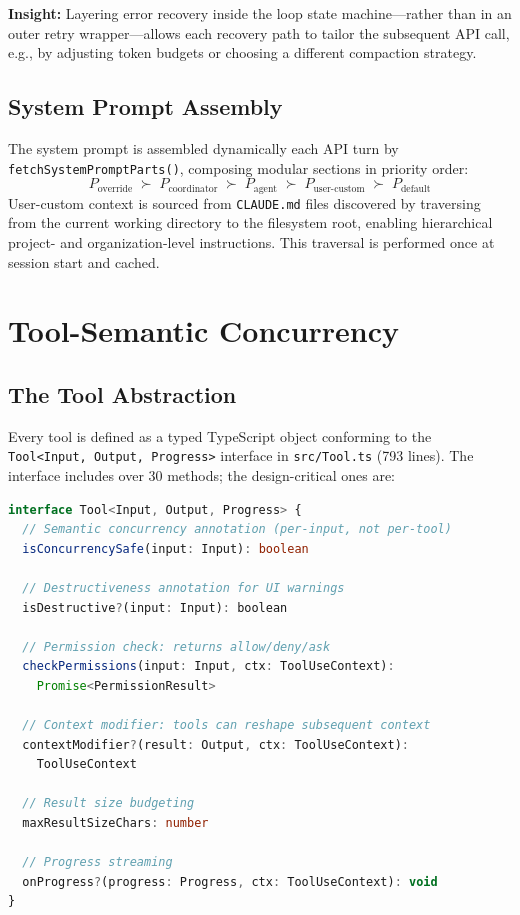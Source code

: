 \documentclass{article}
\newcommand{\file}[1]{\texttt{\small #1}}
\newcommand{\code}[1]{\texttt{#1}}
\newcommand{\insight}[1]{%
  \begin{mdframed}[backgroundcolor=blue!5, linecolor=blue!30, linewidth=0.5pt,
    topline=true, bottomline=true, leftline=true, rightline=true,
    innertopmargin=4pt, innerbottommargin=4pt]
  \small\textbf{Insight:} #1
  \end{mdframed}
}
\begin{document}
\insight{Layering error recovery inside the loop state machine---rather than in an outer retry wrapper---allows each recovery path to tailor the subsequent API call, e.g., by adjusting token budgets or choosing a different compaction strategy.}

\subsection{System Prompt Assembly}

The system prompt is assembled dynamically each API turn by \code{fetchSystemPromptParts()}, composing modular sections in priority order:
\[
  P_{\text{override}} \;\succ\; P_{\text{coordinator}} \;\succ\; P_{\text{agent}} \;\succ\; P_{\text{user-custom}} \;\succ\; P_{\text{default}}
\]
User-custom context is sourced from \code{CLAUDE.md} files discovered by traversing from the current working directory to the filesystem root, enabling hierarchical project- and organization-level instructions. This traversal is performed once at session start and cached.

\section{Tool-Semantic Concurrency}
\label{sec:tools}

\subsection{The Tool Abstraction}

Every tool is defined as a typed TypeScript object conforming to the \code{Tool<Input, Output, Progress>} interface in \file{src/Tool.ts} (793 lines). The interface includes over 30 methods; the design-critical ones are:

\begin{lstlisting}[language=TypeScript, caption={Key \texttt{Tool} interface methods.}, label={lst:tool}]
interface Tool<Input, Output, Progress> {
  // Semantic concurrency annotation (per-input, not per-tool)
  isConcurrencySafe(input: Input): boolean

  // Destructiveness annotation for UI warnings
  isDestructive?(input: Input): boolean

  // Permission check: returns allow/deny/ask
  checkPermissions(input: Input, ctx: ToolUseContext):
    Promise<PermissionResult>

  // Context modifier: tools can reshape subsequent context
  contextModifier?(result: Output, ctx: ToolUseContext):
    ToolUseContext

  // Result size budgeting
  maxResultSizeChars: number

  // Progress streaming
  onProgress?(progress: Progress, ctx: ToolUseContext): void
}
\end{lstlisting}
\end{document}
